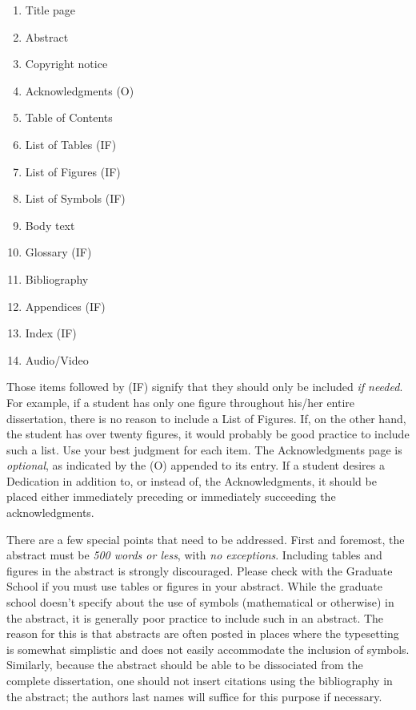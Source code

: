 \documentclass{article}
\begin{document}
\begin{multicols}{2}
  \begin{enumerate}
  \item Title page
  \item Abstract
  \item Copyright notice
  \item Acknowledgments (O)
  \item Table of Contents
  \item List of Tables (IF)
  \item List of Figures (IF)
  \item List of Symbols (IF)
  \item Body text
  \item Glossary (IF)
  \item Bibliography
  \item Appendices (IF)
  \item Index (IF)
  \item Audio/Video
  \end{enumerate}
\end{multicols}

Those items followed by (IF) signify that they should only be included \emph{if needed}. 
For example, if a student has only one figure throughout his/her entire dissertation, there is no reason to include a List of Figures.
If, on the other hand, the student has over twenty figures, it would probably be good practice to include such a list. 
Use your best judgment for each item. The Acknowledgments page is \emph{optional}, as indicated by the (O) appended to its entry. 
If a student desires a Dedication in addition to, or instead of, the Acknowledgments, it should be placed either immediately preceding or immediately succeeding the acknowledgments.

There are a few special points that need to be addressed. 
First and foremost, the abstract must be \emph{500 words or less}, with \emph{no exceptions}. 
Including tables and figures in the abstract is strongly discouraged. 
Please check with the Graduate School if you must use tables or figures in your abstract. 
While the graduate school doesn't specify about the use of symbols (mathematical or otherwise) in the abstract, it is generally poor practice to include such in an abstract. 
The reason for this is that abstracts are often posted in places where the typesetting is somewhat simplistic and does not easily accommodate the inclusion of symbols. 
Similarly, because the abstract should be able to be dissociated from the complete dissertation, one should not insert citations using the bibliography in the abstract; the authors last names will suffice for this purpose if necessary. 
\end{document}
